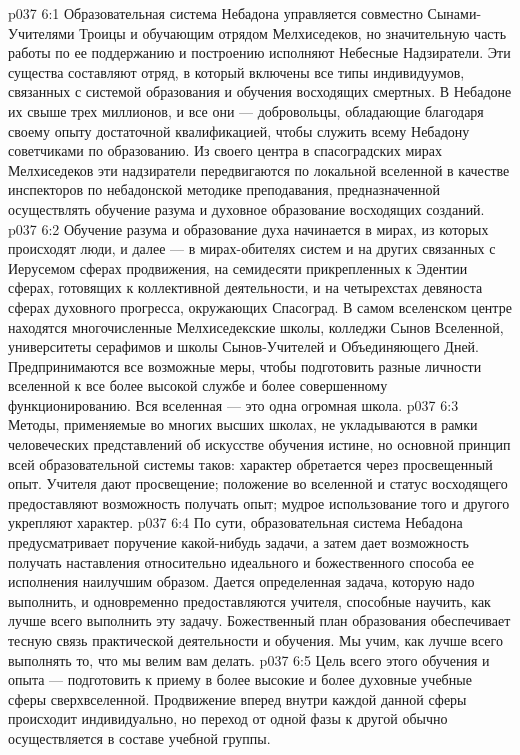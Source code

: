 \vs p037 6:1 Образовательная система Небадона управляется совместно Сынами\hyp{}Учителями Троицы и обучающим отрядом Мелхиседеков, но значительную часть работы по ее поддержанию и построению исполняют Небесные Надзиратели. Эти существа составляют отряд, в который включены все типы индивидуумов, связанных с системой образования и обучения восходящих смертных. В Небадоне их свыше трех миллионов, и все они --- добровольцы, обладающие благодаря своему опыту достаточной квалификацией, чтобы служить всему Небадону советчиками по образованию. Из своего центра в спасоградских мирах Мелхиседеков эти надзиратели передвигаются по локальной вселенной в качестве инспекторов по небадонской методике преподавания, предназначенной осуществлять обучение разума и духовное образование восходящих созданий.
\vs p037 6:2 Обучение разума и образование духа начинается в мирах, из которых происходят люди, и далее --- в мирах\hyp{}обителях систем и на других связанных с Иерусемом сферах продвижения, на семидесяти прикрепленных к Эдентии сферах, готовящих к коллективной деятельности, и на четырехстах девяноста сферах духовного прогресса, окружающих Спасоград. В самом вселенском центре находятся многочисленные Мелхиседекские школы, колледжи Сынов Вселенной, университеты серафимов и школы Сынов\hyp{}Учителей и Объединяющего Дней. Предпринимаются все возможные меры, чтобы подготовить разные личности вселенной к все более высокой службе и более совершенному функционированию. Вся вселенная --- это одна огромная школа.
\vs p037 6:3 \pc Методы, применяемые во многих высших школах, не укладываются в рамки человеческих представлений об искусстве обучения истине, но основной принцип всей образовательной системы таков: характер обретается через просвещенный опыт. Учителя дают просвещение; положение во вселенной и статус восходящего предоставляют возможность получать опыт; мудрое использование того и другого укрепляют характер.
\vs p037 6:4 По сути, образовательная система Небадона предусматривает поручение какой\hyp{}нибудь задачи, а затем дает возможность получать наставления относительно идеального и божественного способа ее исполнения наилучшим образом. Дается определенная задача, которую надо выполнить, и одновременно предоставляются учителя, способные научить, как лучше всего выполнить эту задачу. Божественный план образования обеспечивает тесную связь практической деятельности и обучения. Мы учим, как лучше всего выполнять то, что мы велим вам делать.
\vs p037 6:5 \pc Цель всего этого обучения и опыта --- подготовить к приему в более высокие и более духовные учебные сферы сверхвселенной. Продвижение вперед внутри каждой данной сферы происходит индивидуально, но переход от одной фазы к другой обычно осуществляется в составе учебной группы.
